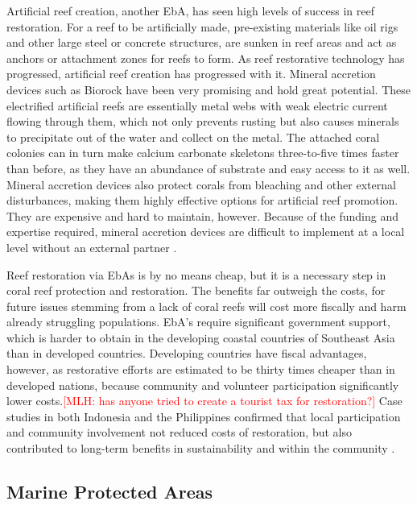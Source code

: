 \documentclass{book}\usepackage{knitr}
\newcommand{\red}[1]{\textcolor{red}{[MLH: #1]}}
\begin{document}
\begin{knitrout}
\begin{kframe}
{Artificial reef creation, another EbA, has seen high levels of success in reef restoration. For a reef to be artificially made, pre-existing materials like oil rigs and other large steel or concrete structures, are sunken in reef areas and act as anchors or attachment zones for reefs to form. As reef restorative technology has progressed, artificial reef creation has progressed with it. Mineral accretion devices such as Biorock have been very promising and hold great potential. These electrified artificial reefs are essentially metal webs with weak electric current flowing through them, which not only prevents rusting but also causes minerals to precipitate out of the water and collect on the metal. The attached coral colonies can in turn make calcium carbonate skeletons three-to-five times faster than before, as they have an abundance of substrate and easy access to it as well. Mineral accretion devices also protect corals from bleaching and other external disturbances, making them highly effective options for artificial reef promotion. They are expensive and hard to maintain, however. Because of the funding and expertise required, mineral accretion devices are difficult to implement at a local level without an external partner \citep{areef}.

Reef restoration via EbAs is by no means cheap, but it is a necessary step in coral reef protection and restoration. The benefits far outweigh the costs, for future issues stemming from a lack of coral reefs will cost more fiscally and harm already struggling populations. EbA’s require significant government support, which is harder to obtain in the developing coastal countries of Southeast Asia than in developed countries. Developing countries have fiscal advantages, however, as restorative efforts are estimated to be thirty times cheaper than in developed nations, because community and volunteer participation significantly lower costs.\red{has anyone tried to create a tourist tax for restoration?} Case studies in both Indonesia and the Philippines confirmed that local participation and community involvement not reduced costs of restoration, but also contributed to long-term benefits in sustainability and within the community \citep{14551496520201201}.

\subsection{Marine Protected Areas}

}
\end{kframe}
\end{knitrout}
\end{document}
